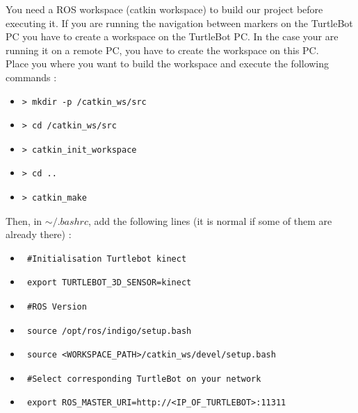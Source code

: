 \documentclass[10pt,a4paper]{article}
\begin{document}
You need a ROS workspace (catkin workspace) to build our project before executing it. If you are running the navigation between markers on the TurtleBot PC you have to create a workspace on the TurtleBot PC. In the case your are running it on a remote PC, you have to create the workspace on this PC.\\

Place you where you want to build the workspace and execute the following commands :

\begin{itemize}
\item[]  \begin{verbatim}> mkdir -p /catkin_ws/src \end{verbatim}
\item[]  \begin{verbatim}> cd /catkin_ws/src \end{verbatim}
\item[]  \begin{verbatim}> catkin_init_workspace \end{verbatim}
\item[]  \begin{verbatim}> cd .. \end{verbatim}
\item[]  \begin{verbatim}> catkin_make \end{verbatim}
\end{itemize}

\newpage

Then, in $\sim/.bashrc$, add the following lines (it is normal if some of them are already there) :

\begin{itemize}
\item[]  \begin{verbatim} #Initialisation Turtlebot kinect \end{verbatim}
\item[]  \begin{verbatim} export TURTLEBOT_3D_SENSOR=kinect \end{verbatim}
\item[]  \begin{verbatim} #ROS Version \end{verbatim}
\item[]  \begin{verbatim} source /opt/ros/indigo/setup.bash \end{verbatim}
\item[]  \begin{verbatim} source <WORKSPACE_PATH>/catkin_ws/devel/setup.bash \end{verbatim}
\item[]  \begin{verbatim} #Select corresponding TurtleBot on your network \end{verbatim}
\item[]  \begin{verbatim} export ROS_MASTER_URI=http://<IP_OF_TURTLEBOT>:11311  \end{verbatim}
\end{itemize}
\end{document}
